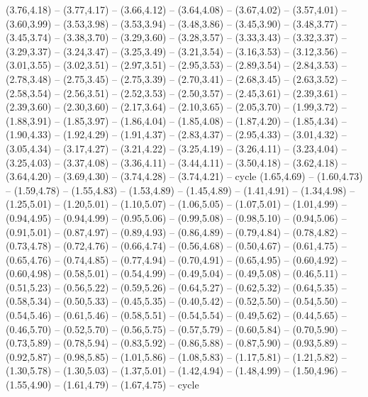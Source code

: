 \expandafter\def\csname geo:gebiet:USA\endcsname{
  (3.76,4.18) -- (3.77,4.17) -- (3.66,4.12) -- (3.64,4.08) -- (3.67,4.02) -- (3.57,4.01) -- (3.60,3.99) -- (3.53,3.98) -- (3.53,3.94) -- (3.48,3.86) -- (3.45,3.90) -- (3.48,3.77) -- (3.45,3.74) -- (3.38,3.70) -- (3.29,3.60) -- (3.28,3.57) -- (3.33,3.43) -- (3.32,3.37) -- (3.29,3.37) -- (3.24,3.47) -- (3.25,3.49) -- (3.21,3.54) -- (3.16,3.53) -- (3.12,3.56) -- (3.01,3.55) -- (3.02,3.51) -- (2.97,3.51) -- (2.95,3.53) -- (2.89,3.54) -- (2.84,3.53) -- (2.78,3.48) -- (2.75,3.45) -- (2.75,3.39) -- (2.70,3.41) -- (2.68,3.45) -- (2.63,3.52) -- (2.58,3.54) -- (2.56,3.51) -- (2.52,3.53) -- (2.50,3.57) -- (2.45,3.61) -- (2.39,3.61) -- (2.39,3.60) -- (2.30,3.60) -- (2.17,3.64) -- (2.10,3.65) -- (2.05,3.70) -- (1.99,3.72) -- (1.88,3.91) -- (1.85,3.97) -- (1.86,4.04) -- (1.85,4.08) -- (1.87,4.20) -- (1.85,4.34) -- (1.90,4.33) -- (1.92,4.29) -- (1.91,4.37) -- (2.83,4.37) -- (2.95,4.33) -- (3.01,4.32) -- (3.05,4.34) -- (3.17,4.27) -- (3.21,4.22) -- (3.25,4.19) -- (3.26,4.11) -- (3.23,4.04) -- (3.25,4.03) -- (3.37,4.08) -- (3.36,4.11) -- (3.44,4.11) -- (3.50,4.18) -- (3.62,4.18) -- (3.64,4.20) -- (3.69,4.30) -- (3.74,4.28) -- (3.74,4.21) -- cycle
  (1.65,4.69) -- (1.60,4.73) -- (1.59,4.78) -- (1.55,4.83) -- (1.53,4.89) -- (1.45,4.89) -- (1.41,4.91) -- (1.34,4.98) -- (1.25,5.01) -- (1.20,5.01) -- (1.10,5.07) -- (1.06,5.05) -- (1.07,5.01) -- (1.01,4.99) -- (0.94,4.95) -- (0.94,4.99) -- (0.95,5.06) -- (0.99,5.08) -- (0.98,5.10) -- (0.94,5.06) -- (0.91,5.01) -- (0.87,4.97) -- (0.89,4.93) -- (0.86,4.89) -- (0.79,4.84) -- (0.78,4.82) -- (0.73,4.78) -- (0.72,4.76) -- (0.66,4.74) -- (0.56,4.68) -- (0.50,4.67) -- (0.61,4.75) -- (0.65,4.76) -- (0.74,4.85) -- (0.77,4.94) -- (0.70,4.91) -- (0.65,4.95) -- (0.60,4.92) -- (0.60,4.98) -- (0.58,5.01) -- (0.54,4.99) -- (0.49,5.04) -- (0.49,5.08) -- (0.46,5.11) -- (0.51,5.23) -- (0.56,5.22) -- (0.59,5.26) -- (0.64,5.27) -- (0.62,5.32) -- (0.64,5.35) -- (0.58,5.34) -- (0.50,5.33) -- (0.45,5.35) -- (0.40,5.42) -- (0.52,5.50) -- (0.54,5.50) -- (0.54,5.46) -- (0.61,5.46) -- (0.58,5.51) -- (0.54,5.54) -- (0.49,5.62) -- (0.44,5.65) -- (0.46,5.70) -- (0.52,5.70) -- (0.56,5.75) -- (0.57,5.79) -- (0.60,5.84) -- (0.70,5.90) -- (0.73,5.89) -- (0.78,5.94) -- (0.83,5.92) -- (0.86,5.88) -- (0.87,5.90) -- (0.93,5.89) -- (0.92,5.87) -- (0.98,5.85) -- (1.01,5.86) -- (1.08,5.83) -- (1.17,5.81) -- (1.21,5.82) -- (1.30,5.78) -- (1.30,5.03) -- (1.37,5.01) -- (1.42,4.94) -- (1.48,4.99) -- (1.50,4.96) -- (1.55,4.90) -- (1.61,4.79) -- (1.67,4.75) -- cycle}
